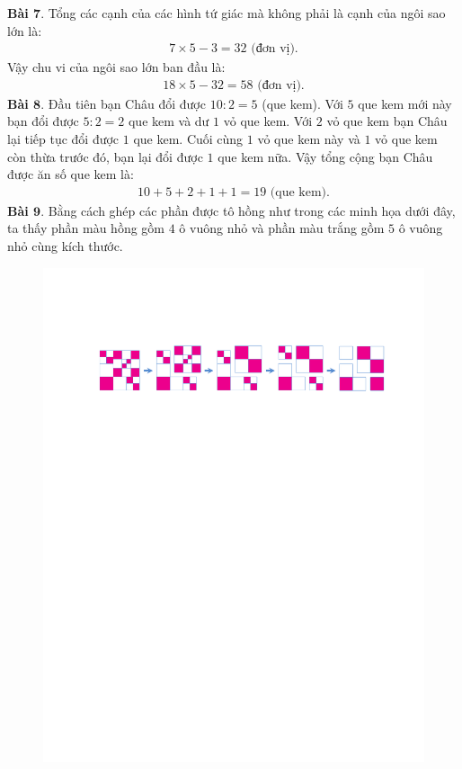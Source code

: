 \begin{multicols}{2}
\begin{figure}[H]
	\end{figure}
	\textbf{\color{toancuabi}Bài $\pmb{7.}$} Tổng các cạnh của các hình tứ giác mà không phải là cạnh của ngôi sao lớn là:
	\begin{align*}
		7\times 5-3 = 32 \text{ (đơn vị).}
	\end{align*}
	Vậy chu vi của ngôi sao lớn ban đầu là:
	\begin{align*}
		18\times 5-32 = 58 \text{ (đơn vị).}
	\end{align*}
	\textbf{\color{toancuabi}Bài $\pmb{8.}$}  Đầu tiên bạn Châu đổi được $10:2=5$ (que kem). Với $5$ que kem mới này bạn đổi được $5:2=2$ que kem và dư $1$ vỏ que kem. Với $2$ vỏ que kem bạn Châu lại tiếp tục đổi được $1$ que kem. Cuối cùng $1$ vỏ que kem này và $1$ vỏ que kem còn thừa trước đó, bạn lại đổi được $1$ que kem nữa. Vậy tổng cộng bạn Châu được ăn số que kem là: 
	\begin{align*}
		10+5+2+1+1=19 \text{ (que kem).}
	\end{align*}
	\textbf{\color{toancuabi}Bài $\pmb{9.}$} Bằng cách ghép các phần được tô hồng như trong các minh họa dưới đây, ta thấy phần màu hồng gồm $4$ ô vuông nhỏ và phần màu trắng gồm $5$ ô vuông nhỏ cùng kích thước.
	\begin{figure}[H]
		\vspace*{-5pt}
		\centering
		\captionsetup{labelformat= empty, justification=centering}
		\includegraphics[width= 1\linewidth]{10a.pdf}

\end{figure}
\end{multicols}
